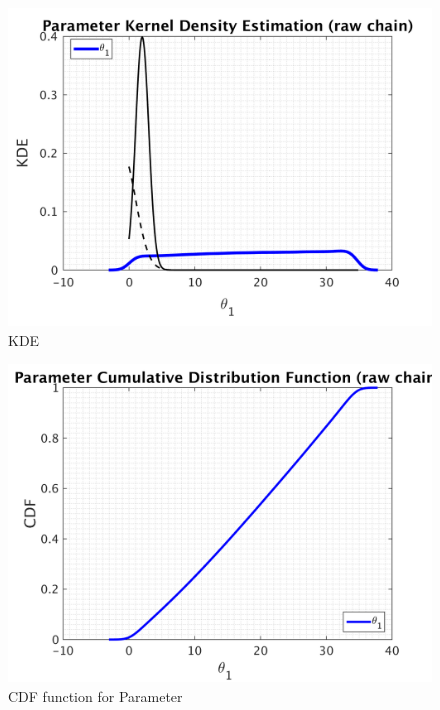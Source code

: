 \begin{figure}[h!]
  
  \centering
   \includegraphics[scale=0.75]{output_10/simple_ip_kde_raw}
   \caption{ KDE }
\end{figure}

\begin{figure}[h!]
  
  \centering
   \includegraphics[scale=0.75]{output_10/simple_ip_cdf_raw}
   \caption{CDF function for Parameter }
\end{figure}



